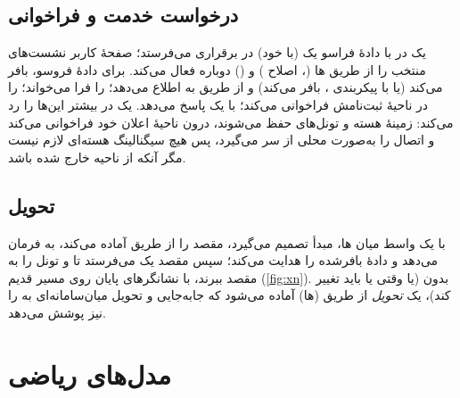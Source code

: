 \documentclass[11pt,a4paper]{article}
\begin{document}
\begin{acnfigure}
  \caption{برقراری نشست  (ساده‌شده) \cite{ts23502}.}
  \label{fig:pdu}
\end{acnfigure}

\subsection{درخواست خدمت و فراخوانی}
یک  در  با دادهٔ فراسو یک  (با  خود) در برقراری  می‌فرستد؛
 صفحهٔ کاربر نشست‌های  منتخب را از طریق ها (، اصلاح ) و 
() دوباره فعال می‌کند. برای دادهٔ فروسو،  بافر می‌کند (یا با پیکربندی ، 
بافر می‌کند) و از طریق  به  اطلاع می‌دهد؛   را فرا می‌خواند؛ 
 را در ناحیهٔ ثبت‌نامش فراخوانی می‌کند؛  با یک  پاسخ می‌دهد. یک  در
 بیشتر این‌ها را رد می‌کند: زمینهٔ هسته و تونل‌های  حفظ می‌شوند،  درون ناحیهٔ اعلان خود
فراخوانی می‌کند و اتصال  را به‌صورت محلی از سر می‌گیرد، پس هیچ سیگنالینگ هسته‌ای لازم نیست مگر آنکه  از ناحیه
خارج شده باشد.

\subsection{تحویل}
با یک واسط  میان ها، مبدأ تصمیم می‌گیرد، مقصد را از طریق  آماده می‌کند، به  فرمان می‌دهد و دادهٔ
بافرشده را هدایت می‌کند؛ سپس مقصد یک  می‌فرستد تا  و  تونل  را به مقصد ببرند،
با نشانگرهای پایان روی مسیر قدیم (\cref{fig:xn}). بدون  (یا وقتی  یا  باید تغییر کند)، یک \emph{تحویل
} از طریق (ها) آماده می‌شود که جابه‌جایی  و تحویل میان‌سامانه‌ای به  را نیز پوشش می‌دهد.

\begin{acnfigure}
  \caption{تحویل  با تغییر مسیر (ساده‌شده).}
  \label{fig:xn}
\end{acnfigure}

\section{مدل‌های ریاضی}
\end{document}
